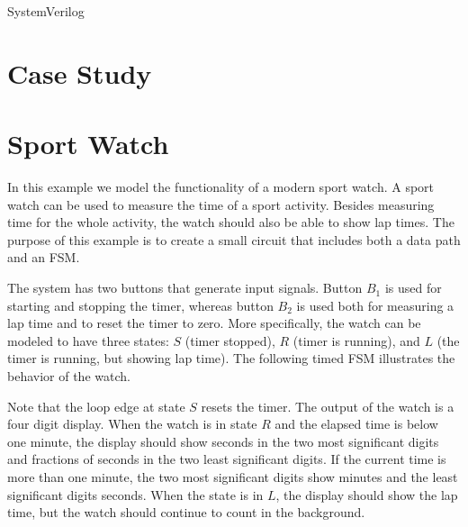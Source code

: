 \documentclass[10pt, conference, compsocconf]{IEEEtran}
\begin{document}
SystemVerilog

\section{Case Study}

\section{Sport Watch}
In this example we model the functionality of a modern sport
watch. A sport watch can be used to 
measure the time of a sport activity. Besides measuring time for the
whole activity, the watch should also be able to show lap times. The
purpose of this example is to create a small circuit that includes both
a data path and an FSM.

The system has two buttons that generate input signals. Button $B_1$
is used for starting and stopping the timer, whereas button $B_2$ is
used both for measuring a lap time and to reset the timer to zero. More
specifically, the watch can be modeled to have three states: $S$
(timer stopped), $R$ (timer is running), and $L$ (the timer is
running, but showing lap time). The following timed FSM illustrates
the behavior of the watch.\\



Note that the loop edge at state $S$ resets the timer. The output
of the watch is a four digit display. When the watch is in state
$R$ and the elapsed time is below one minute, the display should show
seconds in the two most significant digits and fractions of seconds in
the two least significant digits. If the current time is more than one
minute, the two most significant digits show minutes and the least
significant digits seconds. When the state is in $L$, the display
should show the lap time, but the watch should continue to count in
the background.
\end{document}
